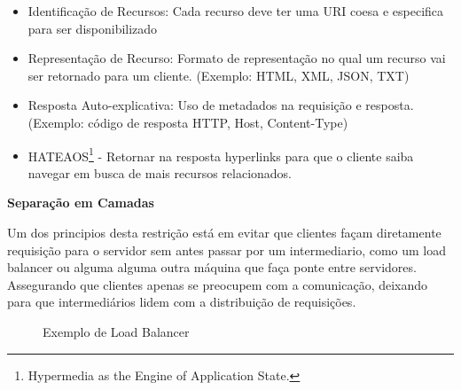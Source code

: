 \begin{itemize}[noitemsep]
\item Identificação de Recursos: Cada recurso deve ter uma URI coesa e especifica para ser disponibilizado
\item Representação de Recurso: Formato de representação no qual um recurso vai ser retornado para um cliente. (Exemplo: HTML, XML, JSON, TXT)
\item Resposta Auto-explicativa: Uso de metadados na requisição e resposta. (Exemplo: código de resposta HTTP, Host, Content-Type)
\item HATEAOS\footnote{
  Hypermedia as the Engine of Application State.
} - Retornar na resposta hyperlinks para que o cliente saiba navegar em busca de mais recursos relacionados.
\end{itemize}

\textbf{Separação em Camadas}

Um dos principios desta restrição está em evitar que clientes façam diretamente requisição para o servidor sem antes passar por um intermediario, como um load balancer ou alguma alguma outra máquina que faça ponte entre servidores. Assegurando que clientes apenas se preocupem com a comunicação, deixando para que intermediários lidem com a distribuição de requisições. \cite{Fielding2000}

\begin{figure}[H]
  \centering
  \caption{Exemplo de Load Balancer}
\end{figure}

